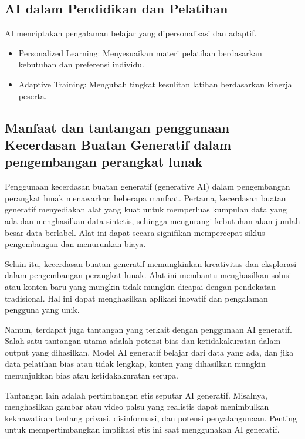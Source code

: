\documentclass{article}
\begin{document}
\subsection{AI dalam Pendidikan dan Pelatihan}
AI menciptakan pengalaman belajar yang dipersonalisasi dan adaptif.
\begin{itemize}
    \item Personalized Learning: Menyesuaikan materi pelatihan berdasarkan kebutuhan dan preferensi individu.
    \item Adaptive Training: Mengubah tingkat kesulitan latihan berdasarkan kinerja peserta.
\end{itemize}

\subsection{Manfaat dan tantangan penggunaan Kecerdasan Buatan Generatif dalam pengembangan perangkat lunak}
Penggunaan kecerdasan buatan generatif (generative AI) dalam pengembangan perangkat lunak menawarkan beberapa manfaat. Pertama, kecerdasan buatan generatif menyediakan alat yang kuat untuk memperluas kumpulan data yang ada dan menghasilkan data sintetis, sehingga mengurangi kebutuhan akan jumlah besar data berlabel. Alat ini dapat secara signifikan mempercepat siklus pengembangan dan menurunkan biaya.

Selain itu, kecerdasan buatan generatif memungkinkan kreativitas dan eksplorasi dalam pengembangan perangkat lunak. Alat ini membantu menghasilkan solusi atau konten baru yang mungkin tidak mungkin dicapai dengan pendekatan tradisional. Hal ini dapat menghasilkan aplikasi inovatif dan pengalaman pengguna yang unik.

Namun, terdapat juga tantangan yang terkait dengan penggunaan AI generatif. Salah satu tantangan utama adalah potensi bias dan ketidakakuratan dalam output yang dihasilkan. Model AI generatif belajar dari data yang ada, dan jika data pelatihan bias atau tidak lengkap, konten yang dihasilkan mungkin menunjukkan bias atau ketidakakuratan serupa.

Tantangan lain adalah pertimbangan etis seputar AI generatif. Misalnya, menghasilkan gambar atau video palsu yang realistis dapat menimbulkan kekhawatiran tentang privasi, disinformasi, dan potensi penyalahgunaan. Penting untuk mempertimbangkan implikasi etis ini saat menggunakan AI generatif.
\end{document}
